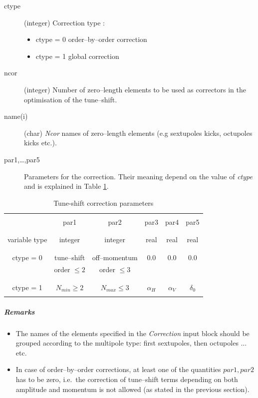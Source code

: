 \documentclass[a4paper,11pt]{report}
\begin{document}
\begin{description}
\item [ctype] (integer) Correction type :
\begin{itemize}
\item ctype = 0 order--by--order correction
\item ctype = 1 global correction
\end{itemize}
\item [ncor] (integer) Number of zero--length elements to be used as
  correctors in the optimisation of the tune--shift.
\item [name(i)] (char) {\em Ncor} \/names of zero--length elements
  (e.g sextupoles kicks, octupoles kicks etc.).
\item [par1,\ldots,par5] Parameters for the correction. Their meaning
  depend on the value of {\em ctype} \/and is explained in Table \ref{tab:CORR}.
\end{description}
\begin{table}
\begin{center}
\caption{Tune-shift correction parameters}
\label{tab:CORR}
\begin{tabular}{|c|c|c|c|c|c|}
  \hline
  & & & & & \\
  & par1 & par2 & par3 & par4 & par5 \\
  & & & & & \\
  \hline
  & & & & & \\
  variable type & integer & integer & real & real & real \\
  & & & & & \\
  \hline
  & & & & & \\
  ctype = 0 & tune--shift & off--momentum & 0.0 & 0.0 & 0.0 \\
  & order $\leq 2 $& order $\leq 3 $& & & \\
  & & & & & \\
  \hline
  & & & & & \\
  ctype = 1 & $N_{min}\geq 2$ & $N_{max}\leq 3$ & $\alpha_H$ &
  $\alpha_V$ &
  $\delta_0 $ \\
  & & & & & \\
  \hline
\end{tabular}
\end{center}
\end{table}
\subparagraph{Remarks}
\begin{itemize}
\item The names of the elements specified in the {\em Correction }
  \/input block should be grouped according to the multipole type:
  first sextupoles, then octupoles $\ldots$ etc.\ 
\item In case of order--by--order corrections, at least one of the
  quantities $par1,par2$ has to be zero, i.e.\ the correction of
  tune--shift terms depending on both amplitude and momentum is not
  allowed (as stated in the previous section).
\end{itemize}
\end{document}
